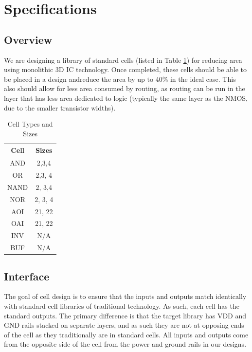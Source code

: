 \documentclass{article}
\begin{document}
\section{Specifications}
\subsection{Overview} We are designing a library of standard cells (listed in Table \ref{tab:cell_table}) for reducing area using monolithic 3D IC technology. Once completed, these cells should be able to be placed in a design andreduce the area by up to 40\% in the ideal case. This also should allow for less area consumed by routing, as routing can be run in the layer that has less area dedicated to logic (typically the same layer as the NMOS, due to the smaller transistor widths).

\begin{table}[ht]
\centering
\begin{tabular}{|c|c|} 
\hline
Cell & Sizes \\ \hline
AND & 2,3,4 \\ \hline
OR & 2,3, 4\\ \hline
NAND & 2, 3,4 \\ \hline
NOR & 2, 3, 4\\ \hline
AOI & 21, 22 \\ \hline
OAI & 21, 22 \\ \hline
INV & N/A \\ \hline
BUF & N/A \\ \hline
\end{tabular}
\caption{Cell Types and Sizes}
\label{tab:cell_table}
\end{table}

\subsection{Interface} The goal of cell design is to ensure that the inputs and outputs match identically with standard cell libraries of traditional technology. As such, each cell has the standard outputs. The primary difference is that the target library has VDD and GND rails stacked on separate layers, and as such they are not at opposing ends of the cell as they traditionally are in standard cells. All inputs and outputs come from the opposite side of the cell from the power and ground rails in our designs. 
\end{document}
